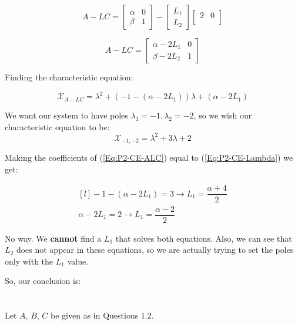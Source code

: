 \documentclass[10pt,a4paper]{article}
\begin{document}
\[
A - LC =
\begin{bmatrix}
\alpha & 0 \\
\beta & 1
\end{bmatrix}
-
\begin{bmatrix}
L_{1}\\
L_{2}
\end{bmatrix}
\begin{bmatrix}
2 & 0 \\
\end{bmatrix}
\]

\[
A - LC =
\begin{bmatrix}
\alpha - 2L_{1} & 0 \\
\beta- 2L_{2} & 1
\end{bmatrix}
\]

Finding the characteristic equation:

\begin{equation}
\mathcal{X}_{A-LC} = \lambda ^{2} + ( -1 -(\alpha -2L_{1}) ) \lambda + ( \alpha - 2L_{1} )
\label{Eq:P2-CE-ALC}
\end{equation}

We want our system to have poles $\lambda_{1} = -1, \lambda_{2} = -2$, so we wish our characteristic equation to be:
\begin{equation}
\mathcal{X}_{-1,-2} = \lambda^{2} + 3 \lambda + 2
\label{Eq:P2-CE-Lambda}
\end{equation}

Making the coefficients of (\ref{Eq:P2-CE-ALC}) equal to (\ref{Eq:P2-CE-Lambda}) we get:

\[ 
\begin{matrix*}[l]
-1 - (\alpha - 2L_{1}) = 3 \rightarrow L_{1} = \dfrac{\alpha + 4}{2} \\
\alpha - 2L_{1} = 2 \rightarrow L_{1} = \dfrac{\alpha - 2}{2}
\end{matrix*}
\]

No way. We \textbf{cannot} find a $L_{1}$ that solves both equations. Also, we can see that $L_{2}$ does not appear in these equations, so we are actually trying to set the poles only with the $L_{1}$ value. 
\medskip

So, our conclusion is:
\begin{center}
\end{center}
\section{}
Let $A$, $B$, $C$ be given as in Questions 1.2.
\end{document}
